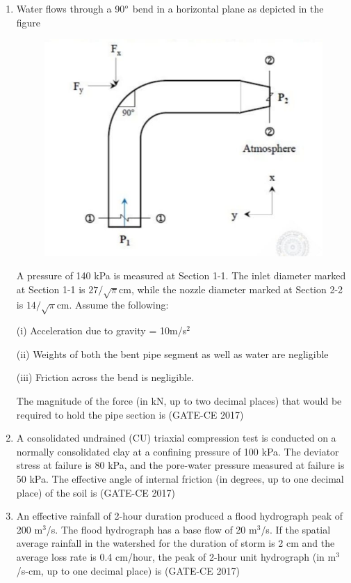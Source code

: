\documentclass[journal,12pt,onecolumn]{article}
\theoremstyle{remark}
\begin{document}
\begin{enumerate}
    \item Water flows through a 90$\degree$ bend in a horizontal plane as depicted in the figure 
    \begin{figure}[H]
    \centering
    \includegraphics[width=0.7\columnwidth]{imageq49.jpg}  
    \caption{}
    \label{fig:49}
    \end{figure}
    A pressure of 140 kPa is measured at Section 1-1. The inlet diameter marked at Section 1-1 is $27/\sqrt{\pi}$cm, while the nozzle diameter marked at Section 2-2 is $14/\sqrt{\pi}$cm. Assume the following:

(i) Acceleration due to gravity = 10m/s$^2$

(ii) Weights of both the bent pipe segment as well as water are negligible

(iii) Friction across the bend is negligible.

    The magnitude of the force (in kN, up to two decimal places) that would be required to hold the pipe section is \underline{\hspace{3cm}}\hfill (GATE-CE 2017)

    \item A consolidated undrained (CU) triaxial compression test is conducted on a normally consolidated clay at a confining pressure of 100 kPa. The deviator stress at failure is 80 kPa, and the pore-water pressure measured at failure is 50 kPa. The effective angle of internal friction (in degrees, up to one decimal place) of the soil is \underline{\hspace{3cm}}\hfill (GATE-CE 2017)

    \item An effective rainfall of 2-hour duration produced a flood hydrograph peak of 200 m$^3$/s. The flood hydrograph has a base flow of 20 m$^3$/s. If the spatial average rainfall in the watershed for the duration of storm is 2 cm and the average loss rate is 0.4 cm/hour, the peak of 2-hour unit hydrograph (in m$^3$/s-cm, up to one decimal place) is \underline{\hspace{3cm}}\hfill (GATE-CE 2017)


\end{enumerate}
\end{document}
